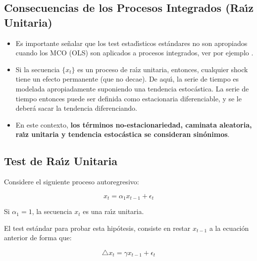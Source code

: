 \subsection{Consecuencias de los Procesos Integrados (Ra\'{\i}z Unitaria)}
\begin{itemize}
	\item Es importante se\~nalar que los test estad\'{\i}sticos est\'andares no son apropiados cuando los MCO (OLS) son aplicados a procesos integrados, ver por ejemplo \cite{granger1974spurious}.
	\item Si la secuencia $\{x_t\}$ es un proceso de ra\'{\i}z unitaria, entonces, cualquier shock tiene un efecto permanente (que no decae). De aqu\'{\i}, la serie de tiempo es modelada apropiadamente suponiendo una tendencia estoc\'astica. La serie de tiempo entonces puede ser definida como estacionaria diferenciable, y se le deber\'a sacar la tendencia diferenciando. 
	\item En este contexto, \textbf{los t\'erminos no-estacionariedad, caminata aleatoria, ra\'{\i}z unitaria y tendencia estoc\'astica se consideran sin\'onimos}. 
\end{itemize}
%

\subsection{Test de Ra\'{\i}z Unitaria}
Considere el siguiente proceso autoregresivo:

\begin{equation} \label{AR1}
x_t =\alpha_1 x_{t-1} + \epsilon_t
\end{equation}

Si $\alpha_1=1$, la secuencia $x_t$ es una ra\'{\i}z unitaria.

El test est\'andar para probar esta hip\'otesis, consiste en restar $x_{t-1}$ a la ecuaci\'on anterior de forma que:

\begin{equation}
\triangle x_t =\gamma x_{t-1} + \epsilon_t
\end{equation}

